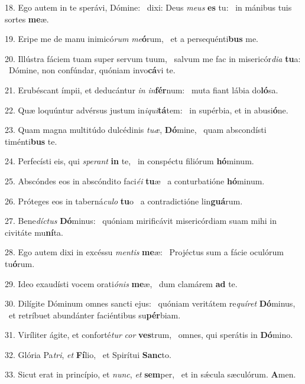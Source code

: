 18. Ego autem in te sperávi, Dómine: \dag\  dixi: Deus \textit{me}\textit{us} \textbf{es} tu: \ast\  in mánibus tuis sortes \textbf{me}æ.\

19. Eripe me de manu inimicó\textit{rum} \textit{me}\textbf{ó}rum, \ast\  et a persequénti\textbf{bus} me.\

20. Illústra fáciem tuam super servum tuum, \dag\  salvum me fac in misericór\textit{di}\textit{a} \textbf{tu}a: \ast\  Dómine, non confúndar, quóniam invo\textbf{cá}vi te.\

21. Erubéscant ímpii, et deducántur \textit{in} \textit{in}\textbf{fér}num: \ast\  muta fiant lábia do\textbf{ló}sa.\

22. Quæ loquúntur advérsus justum in\textit{i}\textit{qui}\textbf{tá}tem: \ast\  in supérbia, et in abusi\textbf{ó}ne.\

23. Quam magna multitúdo dulcédinis \textit{tu}\textit{æ}, \textbf{Dó}mine, \ast\  quam abscondísti timénti\textbf{bus} te.\

24. Perfecísti eis, qui \textit{spe}\textit{rant} \textbf{in} te, \ast\  in conspéctu filiórum \textbf{hó}minum.\

25. Abscóndes eos in abscóndito faci\textit{é}\textit{i} \textbf{tu}æ \ast\  a conturbatióne \textbf{hó}minum.\

26. Próteges eos in taberná\textit{cu}\textit{lo} \textbf{tu}o \ast\  a contradictióne lin\textbf{guá}rum.\

27. Bene\textit{díc}\textit{tus} \textbf{Dó}minus: \ast\  quóniam mirificávit misericórdiam suam mihi in civitáte mu\textbf{ní}ta.\

28. Ego autem dixi in excéssu \textit{men}\textit{tis} \textbf{me}æ: \ast\  Projéctus sum a fácie oculórum tu\textbf{ó}rum.\

29. Ideo exaudísti vocem orati\textit{ó}\textit{nis} \textbf{me}æ, \ast\  dum clamárem \textbf{ad} te.\

30. Dilígite Dóminum omnes sancti ejus: \dag\  quóniam veritátem re\textit{quí}\textit{ret} \textbf{Dó}minus, \ast\  et retríbuet abundánter faciéntibus su\textbf{pér}biam.\

31. Viríliter ágite, et conforté\textit{tur} \textit{cor} \textbf{ves}trum, \ast\  omnes, qui sperátis in \textbf{Dó}mino.\

32. Glória Pa\textit{tri}, \textit{et} \textbf{Fí}lio, \ast\  et Spirítui \textbf{Sanc}to.\

33. Sicut erat in princípio, et \textit{nunc}, \textit{et} \textbf{sem}per, \ast\  et in sǽcula sæculórum. \textbf{A}men.\

